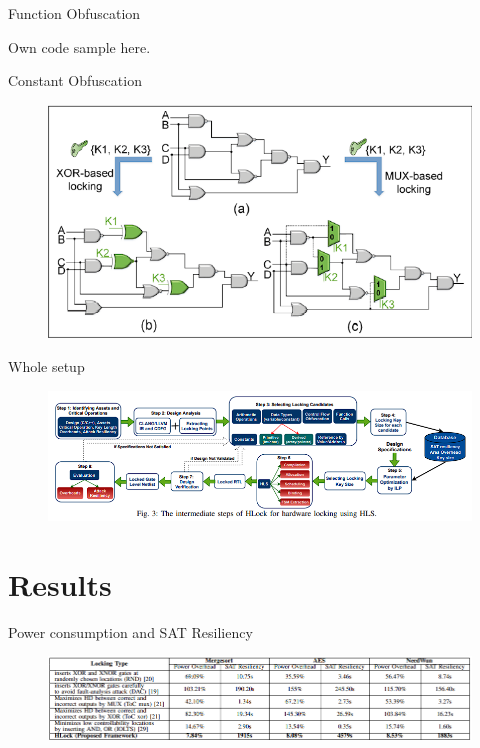\documentclass[xcolor=dvipsnames]{beamer}
\begin{document}
    \begin{frame}{Function Obfuscation}

        Own code sample here.
        
    \end{frame}

    \begin{frame}{Constant Obfuscation}

        \begin{figure}
            \includegraphics[scale=0.6]{XOR_Lock.PNG}
        \end{figure}
        
    \end{frame}

    \begin{frame}{Whole setup}

        \begin{figure}
            \includegraphics[scale=0.6]{HLockPipeline.PNG}
        \end{figure}
        
    \end{frame}

    \section{Results}
    \begin{frame}{Power consumption and SAT Resiliency}
        \begin{figure}
            \includegraphics[scale=0.6]{Result_SAT_Power.PNG}
        \end{figure}
    \end{frame}
\end{document}
